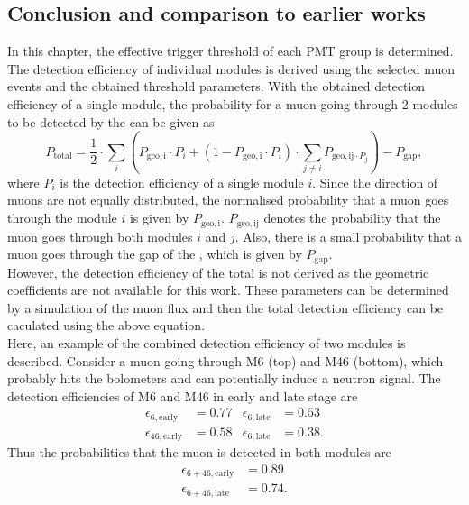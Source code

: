 \subsection{Conclusion and comparison to earlier works}
In this chapter, the effective trigger threshold of each PMT group is determined. The detection efficiency of individual modules is derived using the selected muon events and the obtained threshold parameters. With the obtained detection efficiency of a single module, the probability for a muon going through 2 modules to be detected by the \mvs{} can be given as
\begin{equation}
  P_{\mathrm{total}}=\frac{1}{2}\cdot \sum\limits_{i} \left( P_{\mathrm{geo,i}}\cdot P_{i} +(1-P_{\mathrm{geo,i}}\cdot P_{i})\cdot \sum\limits_{j\ne i} P_{\mathrm{geo,ij}\cdot P_{j}}  \right)-P_{\mathrm{gap}},
\end{equation}
where $P_{i}$ is the detection efficiency of a single module $i$. Since the direction of muons are not equally distributed, the normalised probability that a muon goes through the module $i$ is given by $P_{\mathrm{geo,i}}$. $P_{\mathrm{geo,ij}}$ denotes the probability that the muon goes through both modules $i$ and $j$. Also, there is a small probability that a muon goes through the gap of the \mvs{}, which is given by $P_{\mathrm{gap}}$. \\
However, the detection efficiency of the total \mvs{} is not derived as the geometric coefficients are not available for this work. These parameters can be determined by a simulation of the muon flux and then the total detection efficiency can be caculated using the above equation. \\
Here, an example of the combined detection efficiency of two modules is described. Consider a muon going through M6 (top) and M46 (bottom), which probably hits the bolometers and can potentially induce a neutron signal. The detection efficiencies of M6 and M46 in early and late stage are
\begin{align}
  \epsilon_{6,\mathrm{early}} &= 0.77 & \epsilon_{6,\mathrm{late}} &= 0.53 \\
  \epsilon_{46,\mathrm{early}} &= 0.58 & \epsilon_{6,\mathrm{late}} &= 0.38.
\end{align}
Thus the probabilities that the muon is detected in both modules are
\begin{align}
  \epsilon_{6+46,\mathrm{early}} &= 0.89 \\
  \epsilon_{6+46,\mathrm{late}} &= 0.74.
\end{align}

